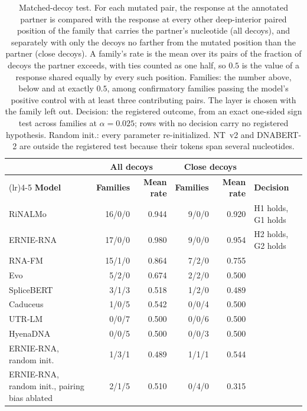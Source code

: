 \begin{table}[htbp]
\centering
\caption{Matched-decoy test. For each mutated pair, the response at the annotated partner is compared with the response at every other deep-interior paired position of the family that carries the partner's nucleotide (all decoys), and separately with only the decoys no farther from the mutated position than the partner (close decoys). A family's rate is the mean over its pairs of the fraction of decoys the partner exceeds, with ties counted as one half, so $0.5$ is the value of a response shared equally by every such position. Families: the number above, below and at exactly $0.5$, among confirmatory families passing the model's positive control with at least three contributing pairs. The layer is chosen with the family left out. Decision: the registered outcome, from an exact one-sided sign test across families at $\alpha = 0.025$; rows with no decision carry no registered hypothesis. Random init.: every parameter re-initialized. NT~v2 and DNABERT-2 are outside the registered test because their tokens span several nucleotides.}
\label{tab:decoy}
\small
\begin{tabular}{@{}>{\raggedright\arraybackslash}p{3.6cm}rrrrl@{}}
\toprule
 & \multicolumn{2}{c}{\textbf{All decoys}} & \multicolumn{2}{c}{\textbf{Close decoys}} & \\
\cmidrule(lr){2-3}\cmidrule(lr){4-5}
\textbf{Model} & \textbf{Families} & \textbf{Mean rate} & \textbf{Families} & \textbf{Mean rate} & \textbf{Decision} \\
\midrule
RiNALMo & 16/0/0 & 0.944 & 9/0/0 & 0.920 & H1 holds, G1 holds \\
ERNIE-RNA & 17/0/0 & 0.980 & 9/0/0 & 0.954 & H2 holds, G2 holds \\
RNA-FM & 15/1/0 & 0.864 & 7/2/0 & 0.755 &  \\
Evo & 5/2/0 & 0.674 & 2/2/0 & 0.500 &  \\
SpliceBERT & 3/1/3 & 0.518 & 1/2/0 & 0.489 &  \\
Caduceus & 1/0/5 & 0.542 & 0/0/4 & 0.500 &  \\
UTR-LM & 0/0/7 & 0.500 & 0/0/6 & 0.500 &  \\
HyenaDNA & 0/0/5 & 0.500 & 0/0/3 & 0.500 &  \\
\midrule
ERNIE-RNA, random init. & 1/3/1 & 0.489 & 1/1/1 & 0.544 &  \\
ERNIE-RNA, random init., pairing bias ablated & 2/1/5 & 0.510 & 0/4/0 & 0.315 &  \\
\bottomrule
\end{tabular}
\end{table}
